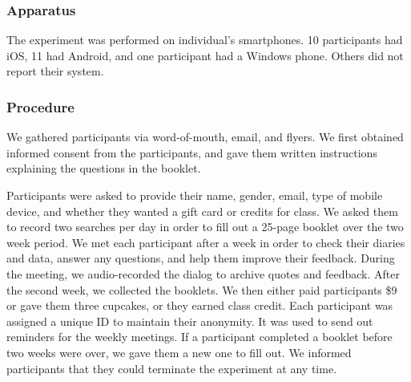 \subsubsection{Apparatus} 
The experiment was performed on individual's smartphones. 10 participants had iOS, 11 had Android, and one participant had a Windows phone. Others did not report their system.

\subsubsection{Procedure} 

We gathered participants via word-of-mouth, email, and flyers. We first obtained informed consent from the participants, and gave them written instructions explaining the questions in the booklet. 

Participants were asked to provide their name, gender, email, type of mobile device, and whether they wanted a gift card or credits for class. We asked them to record two searches per day in order to fill out a 25-page booklet over the two week period. We met each participant after a week in order to check their diaries and data, answer any questions, and help them improve their feedback. During the meeting, we audio-recorded the dialog to archive quotes and feedback. After the second week, we collected the booklets. We then either paid participants \$9 or gave them three cupcakes, or they earned class credit. Each participant was assigned a unique ID to maintain their anonymity. It was used to send out reminders for the weekly meetings. If a participant completed a booklet before two weeks were over, we gave them a new one to fill out. We informed participants that they could terminate the experiment at any time.
